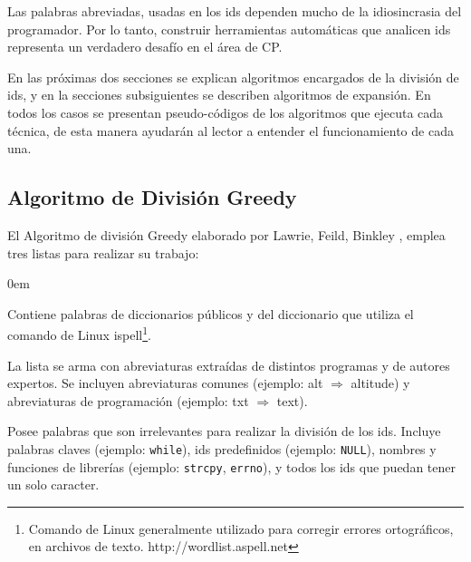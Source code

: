 Las palabras abreviadas, usadas en los ids dependen mucho de la idiosincrasia del programador. Por lo tanto, construir herramientas automáticas que analicen ids representa un verdadero desafío en el área de CP.

En las próximas dos secciones se explican algoritmos encargados de la división de ids, y en la secciones subsiguientes se describen algoritmos de expansión. En todos los casos se presentan pseudo-códigos de los algoritmos que ejecuta cada técnica, de esta manera ayudarán al lector a entender el funcionamiento de cada una.


\subsection{Algoritmo de División Greedy}
\label{sec:algGre}

El Algoritmo de división Greedy elaborado por Lawrie, Feild, Binkley \cite{DLFB06,FBL06,HDD06,LFBEX07,EHPV09}, emplea tres listas para realizar su trabajo:

\begin{description}
\itemsep0em%
\item[Palabras de diccionarios:] Contiene palabras de diccionarios públicos y del diccionario que utiliza el comando de Linux \textsf{ispell}\footnote[1]{Comando de Linux generalmente utilizado para corregir errores ortográficos, en archivos de texto. http://wordlist.aspell.net}.

\item[Abreviaturas conocidas:] La lista se arma con abreviaturas extraídas de distintos programas y de autores expertos. Se incluyen abreviaturas comunes (ejemplo: \textsf{alt} $\Rightarrow$ \textsf{altitude}) y abreviaturas de programación (ejemplo: \textsf{txt} $\Rightarrow$ \textsf{text}).

\item[Palabras excluyentes (stop list):] Posee palabras que son irrelevantes para realizar la división de los ids. Incluye palabras claves (ejemplo: \texttt{while}), ids predefinidos (ejemplo: \texttt{NULL}), nombres y funciones de librerías (ejemplo: \texttt{strcpy}, \texttt{errno}), y todos los ids que puedan tener un solo caracter.
\end{description}


